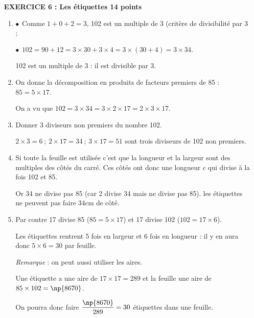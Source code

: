 \documentclass[10pt]{article}
\begin{document}
\vspace{0,5cm}

\textbf{EXERCICE 6 : Les étiquettes \hfill 14 points}

\medskip
 
\begin{enumerate}
\item %
$\bullet~~$Comme $1 + 0 + 2 = 3$, 102 est un multiple de 3 (critère de divisibilité par 3 ;

$\bullet~~$$102 = 90 + 12 = 3\times 30 + 3 \times 4 = 3\times (30 + 4) = 3\times 34$.

102 est un multiple de 3  : il est divisible par 3.
\item On donne la décomposition en produits de facteurs premiers de 85 : $85 = 5 \times 17$.

On a vu que $102 = 3 \times 34 = 3 \times 2 \times 17 = 2 \times 3 \times 17$.
\item Donner 3 diviseurs non premiers du nombre 102.

$2 \times 3 = 6 \:;\:  2 \times 17 = 34 \:;\: 3 \times 17 = 51$ sont trois diviseurs de 102 non premiers. 

%
%
\item %
Si toute la feuille est utilisée c'est que la longueur et la largeur sont des multiples des côtés du carré. Ces côtés ont donc une  longueur $c$ qui divise à la fois 102 et 85.

Or 34 ne divise pas 85 (car 2 divise 34 mais ne divise pas 85). les étiquettes ne peuvent pas faire 34cm de côté.
\item %

Par contre 17 divise 85 ($85 = 5 \times 17$) et 17 divise 102 ($102 = 17 \times 6$).

Les étiquettes rentrent 5 fois en largeur et 6 fois en longueur : il y en aura donc $5 \times 6 = 30$ par feuille.

\emph{Remarque } : on peut aussi utiliser les aires.

Une étiquette a une aire de $17 \times 17 = 289$ et la feuille une aire de $85 \times 102 = \np{8670}$.

On pourra donc faire $\dfrac{\np{8670}}{289} = 30$ étiquettes dans une feuille.
\end{enumerate}
\end{document}
